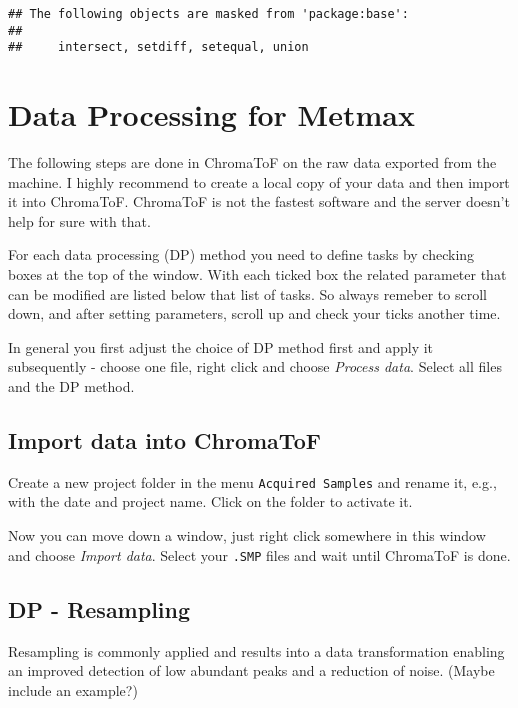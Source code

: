 \documentclass[]{book}
\begin{document}
\begin{verbatim}
## The following objects are masked from 'package:base':
## 
##     intersect, setdiff, setequal, union
\end{verbatim}

\hypertarget{metmaxproc}{%
\chapter{Data Processing for Metmax}\label{metmaxproc}}

The following steps are done in ChromaToF on the raw data exported from the machine. I highly recommend to create a local copy of your data and then import it into ChromaToF. ChromaToF is not the fastest software and the server doesn't help for sure with that.

For each data processing (DP) method you need to define tasks by checking boxes at the top of the window. With each ticked box the related parameter that can be modified are listed below that list of tasks. So always remeber to scroll down, and after setting parameters, scroll up and check your ticks another time.

In general you first adjust the choice of DP method first and apply it subsequently - choose one file, right click and choose \emph{Process data}. Select all files and the DP method.

\hypertarget{import-data-into-chromatof}{%
\section{Import data into ChromaToF}\label{import-data-into-chromatof}}

Create a new project folder in the menu \texttt{Acquired\ Samples} and rename it, e.g., with the date and project name. Click on the folder to activate it.

Now you can move down a window, just right click somewhere in this window and choose \emph{Import data}. Select your \texttt{.SMP} files and wait until ChromaToF is done.

\hypertarget{dp---resampling}{%
\section{DP - Resampling}\label{dp---resampling}}

Resampling is commonly applied and results into a data transformation enabling an improved detection of low abundant peaks and a reduction of noise. (Maybe include an example?)
\end{document}
